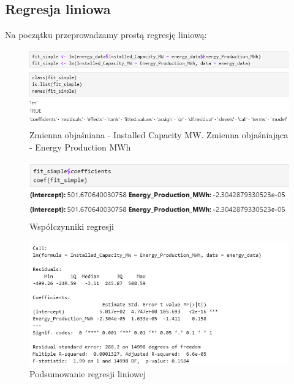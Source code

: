 \subsection{Regresja liniowa}
Na początku przeprowadzamy prostą regresję liniową:

\begin{figure}[H]
    \centering
    \includegraphics[width=0.9\linewidth]{lab1/obraz.png}
    \caption{Zmienna objaśniana - Installed Capacity MW. Zmienna objaśniająca - Energy Production MWh}
    \label{fig:regression}
\end{figure}

\begin{figure}[H]
    \centering
    \includegraphics[width=0.9\linewidth]{lab1/obraz2.png}
    \caption{Współczynniki regresji}
    \label{fig:coefficients}
\end{figure}

\begin{figure}[H]
    \centering
    \includegraphics[width=0.9\linewidth]{lab1/obraz3.png}
    \caption{Podsumowanie regresji liniowej}
    \label{fig:summary}
\end{figure}

